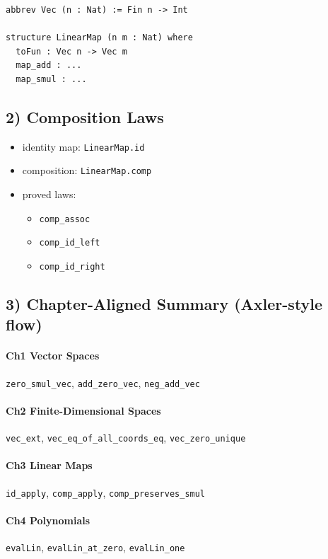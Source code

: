 \documentclass[11pt]{article}
\begin{document}
\begin{lstlisting}
abbrev Vec (n : Nat) := Fin n -> Int

structure LinearMap (n m : Nat) where
  toFun : Vec n -> Vec m
  map_add : ...
  map_smul : ...
\end{lstlisting}

\subsection*{2) Composition Laws}
\begin{itemize}[leftmargin=1.5em]
  \item identity map: \texttt{LinearMap.id}
  \item composition: \texttt{LinearMap.comp}
  \item proved laws:
  \begin{itemize}
    \item \texttt{comp\_assoc}
    \item \texttt{comp\_id\_left}
    \item \texttt{comp\_id\_right}
  \end{itemize}
\end{itemize}

\subsection*{3) Chapter-Aligned Summary (Axler-style flow)}
\paragraph{Ch1 Vector Spaces}
\texttt{zero\_smul\_vec}, \texttt{add\_zero\_vec}, \texttt{neg\_add\_vec}

\paragraph{Ch2 Finite-Dimensional Spaces}
\texttt{vec\_ext}, \texttt{vec\_eq\_of\_all\_coords\_eq}, \texttt{vec\_zero\_unique}

\paragraph{Ch3 Linear Maps}
\texttt{id\_apply}, \texttt{comp\_apply}, \texttt{comp\_preserves\_smul}

\paragraph{Ch4 Polynomials}
\texttt{evalLin}, \texttt{evalLin\_at\_zero}, \texttt{evalLin\_one}
\end{document}
